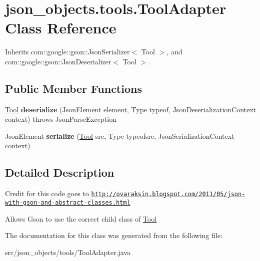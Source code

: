\hypertarget{classjson__objects_1_1tools_1_1_tool_adapter}{
\section{json\_\-objects.tools.ToolAdapter Class Reference}
\label{classjson__objects_1_1tools_1_1_tool_adapter}
}


Inherits com::google::gson::JsonSerializer$<$ Tool $>$, and com::google::gson::JsonDeserializer$<$ Tool $>$.

\subsection*{Public Member Functions}
\begin{DoxyCompactItemize}
\item 
\hypertarget{classjson__objects_1_1tools_1_1_tool_adapter_af7f3baa151e4b5f6a6ba06a0d86db14f}{
\hyperlink{classjson__objects_1_1tools_1_1_tool}{Tool} {\bfseries deserialize} (JsonElement element, Type typeof, JsonDeserializationContext context)  throws JsonParseException }
\label{classjson__objects_1_1tools_1_1_tool_adapter_af7f3baa151e4b5f6a6ba06a0d86db14f}

\item 
\hypertarget{classjson__objects_1_1tools_1_1_tool_adapter_a9501290fdf428c63c7a415b2dd1fc0b0}{
JsonElement {\bfseries serialize} (\hyperlink{classjson__objects_1_1tools_1_1_tool}{Tool} src, Type typeofsrc, JsonSerializationContext context)}
\label{classjson__objects_1_1tools_1_1_tool_adapter_a9501290fdf428c63c7a415b2dd1fc0b0}

\end{DoxyCompactItemize}


\subsection{Detailed Description}
Credit for this code goes to \href{http://ovaraksin.blogspot.com/2011/05/json-with-gson-and-abstract-classes.html}{\tt http://ovaraksin.blogspot.com/2011/05/json-\/with-\/gson-\/and-\/abstract-\/classes.html}

Allows Gson to use the correct child class of \hyperlink{classjson__objects_1_1tools_1_1_tool}{Tool} 

The documentation for this class was generated from the following file:\begin{DoxyCompactItemize}
\item 
src/json\_\-objects/tools/ToolAdapter.java\end{DoxyCompactItemize}
